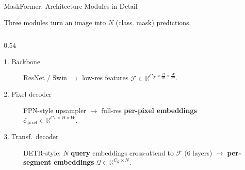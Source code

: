 \begin{frame}[fragile]{MaskFormer: Architecture Modules in Detail}

  Three modules turn an image into $N$ (class, mask) predictions.

  \vspace{0.2em}
  \begin{columns}[t]
    \begin{column}{0.54\textwidth}
      \begin{description}
        \item[\textcolor{orange!70!black}{1. Backbone}] ResNet / Swin $\to$ low-res features $\mathcal{F} \in \mathbb{R}^{C_\mathcal{F} \times \frac{H}{32} \times \frac{W}{32}}$.
        \item[\textcolor{cyan!60!black}{2. Pixel decoder}] FPN-style upsampler $\to$ full-res \textbf{per-pixel embeddings} $\mathcal{E}_\text{pixel} \in \mathbb{R}^{C_\mathcal{E} \times H \times W}$.
        \item[\textcolor{red!60!black}{3. Transf.\ decoder}] DETR-style: $N$ \textbf{query} embeddings cross-attend to $\mathcal{F}$ ($6$ layers) $\to$ \textbf{per-segment embeddings} $\mathcal{Q} \in \mathbb{R}^{C_\mathcal{Q} \times N}$.
      \end{description}


\end{column}
\end{columns}
\end{frame}
